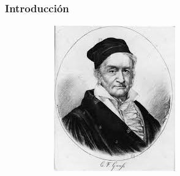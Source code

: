 
\subsection{}

{\nologo
\begin{frame}\frametitle{Introducción}
	
	
	\begin{figure}
		\centering
		\begin{subfigure}[b]{0.27\textwidth}
			\includegraphics[width=\textwidth]{imagenes/Gauss}
		\end{subfigure}
		\hspace{1.5cm}
		~ %
		\begin{subfigure}[b]{0.23\textwidth}

\end{subfigure}
\end{figure}
\end{frame}}
